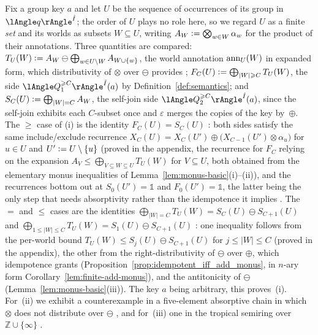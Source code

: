\begin{proofsketch}
Fix a group key $a$ and let $U$ be the sequence of occurrences of its
group in~$\angsem{\hat I}{q}$; the order of $U$ plays no role here, so we
regard $U$ as a finite \emph{set} and its worlds as subsets $W\subseteq U$,
writing $A_W\mathrel{\mathop:}=\bigotimes_{w\in W}\alpha_w$ for the product of their
annotations. Three quantities are compared:
$T_U(W)\mathrel{\mathop:}= A_W\ominus\bigoplus_{w\in U\setminus W}A_{W\cup\{w\}}$, the
world annotation $\mathrm{ann}_U(W)$ in expanded form, which distributivity of
$\otimes$ over $\ominus$ provides
;
$F_C(U)\mathrel{\mathop:}=\bigoplus_{|W|\geqslant C}T_U(W)$, the  side
$\angsem{\hat I}{Q^{\ge C}_1}(a)$ by Definition~\ref{def:semantics}; and
$S_C(U)\mathrel{\mathop:}=\bigoplus_{|W|=C}A_W$, the self-join side
$\angsem{\hat I}{Q^{\ge C}_2}(a)$, since the self-join exhibits each
$C$-subset once and $\varepsilon$ merges the copies of the key by~$\oplus$.
The $\ge$ case of (i) is the identity $F_C(U)=S_C(U)$
: both sides satisfy the same include/exclude
recurrence $X_C(U)=X_C(U')\oplus\bigl(X_{C-1}(U')\otimes\alpha_u\bigr)$ for
$u\in U$ and $U'\mathrel{\mathop:}= U\setminus\{u\}$ (proved in the appendix, the
recurrence for $F_C$ relying on the expansion
$A_V\le\bigoplus_{V\subseteq W\subseteq U}T_U(W)$ for $V\subseteq U$,
both obtained from the elementary monus inequalities of
Lemma~\ref{lem:monus-basic}(i)--(ii)),
and the recurrences bottom out at
$S_0(U')=\mathbb 1$ and $F_0(U')=\mathbb 1$, the latter being the only step
that needs absorptivity rather than the idempotence it implies
. The $=$ and $\le$ cases are the
identities $\bigoplus_{|W|=C}T_U(W)=S_C(U)\ominus S_{C+1}(U)$ and
$\bigoplus_{1\le|W|\le C}T_U(W)=S_1(U)\ominus S_{C+1}(U)$
: one inequality follows from the
per-world bound $T_U(W)\le S_j(U)\ominus S_{C+1}(U)$ for $j\le|W|\le C$
(proved in the appendix), the other from the right-distributivity of
$\ominus$ over $\oplus$, which idempotence grants
(Proposition~\ref{prop:idempotent_iff_add_monus}, in $n$-ary form
Corollary~\ref{lem:finite-add-monus}), and the
antitonicity of $\ominus$ (Lemma~\ref{lem:monus-basic}(iii)). The key $a$
being arbitrary, this proves~(i). For~(ii) we exhibit a counterexample in
a five-element absorptive chain in which $\otimes$ does not distribute
over $\ominus$
,
and for~(iii) one in the tropical semiring over~$\mathbb Z\cup\{\infty\}$
.
\end{proofsketch}

